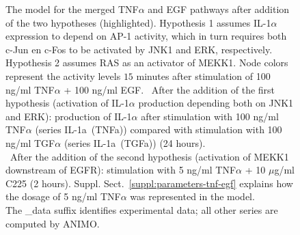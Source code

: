 \documentclass{bmcart}
\begin{document}
\begin{backmatter}
\begin{figure}[!tpb]
\begin{center}
\end{center}
\caption{\scriptsize
{\bf \protect{}} The model for the merged TNF$\alpha$ and EGF pathways
after addition of the two hypotheses (highlighted).
Hypothesis 1 assumes IL-1$\alpha$ expression to depend on AP-1 activity, which in turn requires
both c-Jun en c-Fos to be activated by JNK1 and ERK, respectively. Hypothesis 2 assumes RAS as an activator
of MEKK1. Node colors represent the activity levels $15$ minutes
after stimulation of 100 ng/ml TNF$\alpha$ + 100 ng/ml EGF.
{\bf \protect{}}~After the addition of the first hypothesis (activation of IL-1$\alpha$ production depending both
on JNK1 and ERK): production of IL-1$\alpha$ after stimulation with 100 ng/ml TNF$\alpha$ (series {\sf IL-1a~(TNFa)})
compared with stimulation with 100 ng/ml TGF$\alpha$ (series {\sf IL-1a~(TGFa)}) (24 hours).\\
{\bf \protect{}}~After the addition of the second hypothesis (activation of MEKK1 downstream of EGFR):
stimulation with 5 ng/ml TNF$\alpha$ + 10 $\mu$g/ml C225 (2 hours).
Suppl. Sect.~\ref{suppl:parameters-tnf-egf} explains how the dosage of 5 ng/ml TNF$\alpha$ was represented in the model.\\
The {\sf \_{}data} suffix identifies experimental data; all other series are computed by ANIMO.}\label{fig:large-model-graph}
\end{figure}





\def\scalaOldModel{0.25}
\def\reactantTA{\texttt{[image: images/Reactant\_R3]}}
\newlength\reactantTAheight
\setlength\reactantTAheight{\heightof{\reactantTA}}


\end{backmatter}
\end{document}
